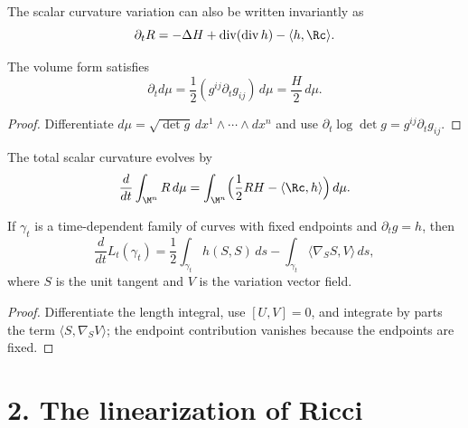 \begin{remark}
\label{ch03-rem-scalar-curvature-invariant-form}
The scalar curvature variation can also be written invariantly as
\[
\partial_t R=-\Delta H+\operatorname{div}(\operatorname{div} h)-\langle h,\Rc\rangle.
\]
\end{remark}

\begin{lemma}
\label{ch03-lem-volume-element-evolves}
The volume form satisfies
\[
\partial_t d\mu=\frac12(g^{ij}\partial_t g_{ij})\,d\mu=\frac{H}{2}\,d\mu.
\]
\end{lemma}

\begin{proof}
\sketch Differentiate \(d\mu=\sqrt{\det g}\,dx^1\wedge\cdots\wedge dx^n\) and use \(\partial_t\log\det g=g^{ij}\partial_t g_{ij}\).
\end{proof}

\begin{corollary}
\label{ch03-cor-total-scalar-curvature-evolves}
The total scalar curvature evolves by
\[
\frac{d}{dt}\int_{\M^n}R\,d\mu
=\int_{\M^n}\Bigl(\frac12 RH-\langle \Rc,h\rangle\Bigr)\,d\mu.
\]
\end{corollary}

\begin{lemma}
\label{ch03-lem-length-evolves}
If \(\gamma_t\) is a time-dependent family of curves with fixed endpoints and \(\partial_t g=h\), then
\[
\frac{d}{dt}L_t(\gamma_t)
=\frac12\int_{\gamma_t}h(S,S)\,ds-\int_{\gamma_t}\langle\nabla_S S,V\rangle\,ds,
\]
where \(S\) is the unit tangent and \(V\) is the variation vector field.
\end{lemma}

\begin{proof}
\sketch Differentiate the length integral, use \([U,V]=0\), and integrate by parts the term \(\langle S,\nabla_S V\rangle\); the endpoint contribution vanishes because the endpoints are fixed.
\end{proof}

\section*{2. The linearization of Ricci}

